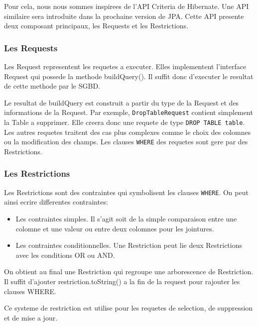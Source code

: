 Pour cela, nous nous sommes inspirees de l'API Criteria de Hibernate. Une API similaire sera introduite dans la prochaine version de JPA. Cette API presente deux composant principaux, les Requests et les Restrictions.
\subsubsection{Les Requests}
Les Request representent les requetes a executer. Elles implementent l'interface Request qui possede la methode buildQuery(). Il suffit donc d'executer le resultat de cette methode par le SGBD.

Le resultat de buildQuery est construit a partir du type de la Request et des informations de la Request. Par exemple, \texttt{DropTableRequest} contient simplement la Table a supprimer. Elle creera donc une requete de type \texttt{DROP TABLE table}. Les autres requetes traitent des cas plus complexes comme le choix des colomnes ou la modification des champs. 
Les clauses \texttt{WHERE} des requetes sont gere par des Restrictions.
\subsubsection{Les Restrictions}
Les Restrictions sont des contraintes qui symbolisent les clauses \texttt{WHERE}. On peut ainsi ecrire differentes contraintes:
\begin{itemize}
 \item Les contraintes simples. Il s'agit soit de la simple comparaison entre une colomne et une valeur ou entre deux colomnes pour les jointures.
 \item Les contraintes conditionnelles. Une Restriction peut lie deux Restrictions avec les conditions OR ou AND.
\end{itemize}
On obtient au final une Restriction qui regroupe une arborescence de Restriction. Il suffit d'ajouter restriction.toString() a la fin de la request pour rajouter les clauses WHERE. 

Ce systeme de restriction est utilise pour les requetes de selection, de suppression et de mise a jour.

